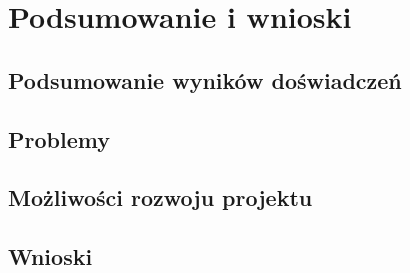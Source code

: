 \documentclass[12pt, a4paper]{article}
\begin{document}
\FloatBarrier
\section{Podsumowanie i wnioski}
\subsection{Podsumowanie wyników doświadczeń}
\subsection{Problemy}
\subsection{Możliwości rozwoju projektu}
\subsection{Wnioski}
\end{document}
